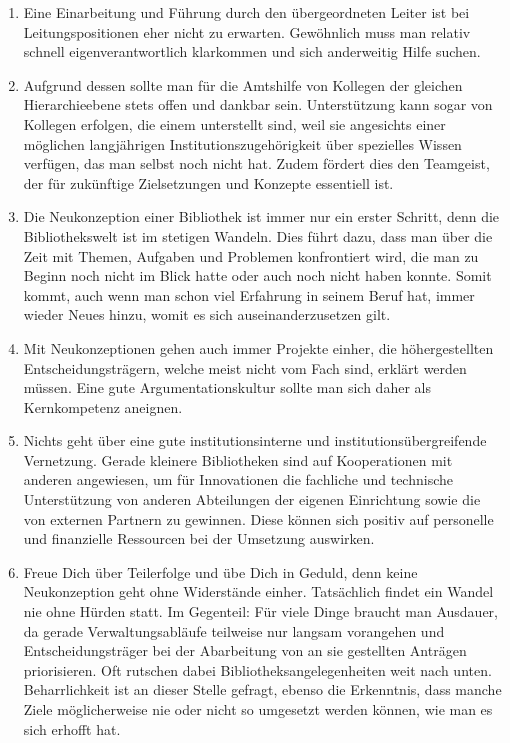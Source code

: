 \documentclass[a4paper,
fontsize=11pt,
oneside,
numbers=noperiodatend,
parskip=half-,
bibliography=totoc,
final
]{scrartcl}
\begin{document}
\begin{enumerate}
  Einrichtung auf die Unterstützung anderer (möglicherweise größerer
  Player) angewiesen ist.
\item
  Eine Einarbeitung und Führung durch den übergeordneten Leiter ist bei
  Leitungspositionen eher nicht zu erwarten. Gewöhnlich muss man relativ
  schnell eigenverantwortlich klarkommen und sich anderweitig Hilfe
  suchen.
\item
  Aufgrund dessen sollte man für die Amtshilfe von Kollegen der gleichen
  Hierarchieebene stets offen und dankbar sein. Unterstützung kann sogar
  von Kollegen erfolgen, die einem unterstellt sind, weil sie angesichts
  einer möglichen langjährigen Institutionszugehörigkeit über spezielles
  Wissen verfügen, das man selbst noch nicht hat. Zudem fördert dies den
  Teamgeist, der für zukünftige Zielsetzungen und Konzepte essentiell
  ist.
\item
  Die Neukonzeption einer Bibliothek ist immer nur ein erster Schritt,
  denn die Bibliothekswelt ist im stetigen Wandeln. Dies führt dazu,
  dass man über die Zeit mit Themen, Aufgaben und Problemen konfrontiert
  wird, die man zu Beginn noch nicht im Blick hatte oder auch noch nicht
  haben konnte. Somit kommt, auch wenn man schon viel Erfahrung in
  seinem Beruf hat, immer wieder Neues hinzu, womit es sich
  auseinanderzusetzen gilt.
\item
  Mit Neukonzeptionen gehen auch immer Projekte einher, die
  höhergestellten Entscheidungsträgern, welche meist nicht vom Fach
  sind, erklärt werden müssen. Eine gute Argumentationskultur sollte man
  sich daher als Kernkompetenz aneignen.
\item
  Nichts geht über eine gute institutionsinterne und
  institutionsübergreifende Vernetzung. Gerade kleinere Bibliotheken
  sind auf Kooperationen mit anderen angewiesen, um für Innovationen die
  fachliche und technische Unterstützung von anderen Abteilungen der
  eigenen Einrichtung sowie die von externen Partnern zu gewinnen. Diese
  können sich positiv auf personelle und finanzielle Ressourcen bei der
  Umsetzung auswirken.
\item
  Freue Dich über Teilerfolge und übe Dich in Geduld, denn keine
  Neukonzeption geht ohne Widerstände einher. Tatsächlich findet ein
  Wandel nie ohne Hürden statt. Im Gegenteil: Für viele Dinge braucht
  man Ausdauer, da gerade Verwaltungsabläufe teilweise nur langsam
  vorangehen und Entscheidungsträger bei der Abarbeitung von an sie
  gestellten Anträgen priorisieren. Oft rutschen dabei
  Bibliotheksangelegenheiten weit nach unten. Beharrlichkeit ist an
  dieser Stelle gefragt, ebenso die Erkenntnis, dass manche Ziele
  möglicherweise nie oder nicht so umgesetzt werden können, wie man es
  sich erhofft hat.
\end{enumerate}
\end{document}
